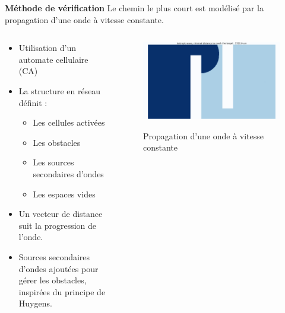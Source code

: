 \documentclass[aspectratio=169,10pt]{beamer}
\begin{document}
\begin{frame}{\textbf{Méthode de vérification}}
    Le chemin le plus court est modélisé par la propagation d'une onde à vitesse constante.\cite{tapia_2016}
	\begin{columns}[t]
		\begin{column}{0.6\textwidth}
			\begin{itemize}
				\item Utilisation d'un automate cellulaire (CA)
				\vspace{0.2cm}
				\item La structure en réseau définit :
				\begin{itemize}
					\item Les cellules activées
					\vspace{0.1cm}
					\item Les obstacles
					\vspace{0.1cm}
					\item Les sources secondaires d'ondes
					\vspace{0.1cm}
					\item Les espaces vides
				\end{itemize}
				\item Un vecteur de distance suit la progression de l'onde.
				\vspace{0.2cm}
				\item Sources secondaires d'ondes ajoutées pour gérer les obstacles, inspirées du principe de Huygens.
			\end{itemize}
		\end{column}
		\begin{column}{0.4\textwidth}
			\begin{figure}
				\centering
				\includegraphics[width=\textwidth]{IMAGES/ca2.png}
				\label{fig:ca2}
				\caption{Propagation d'une onde à vitesse constante}
			\end{figure}
		\end{column}
	\end{columns}

\end{frame}
\end{document}
